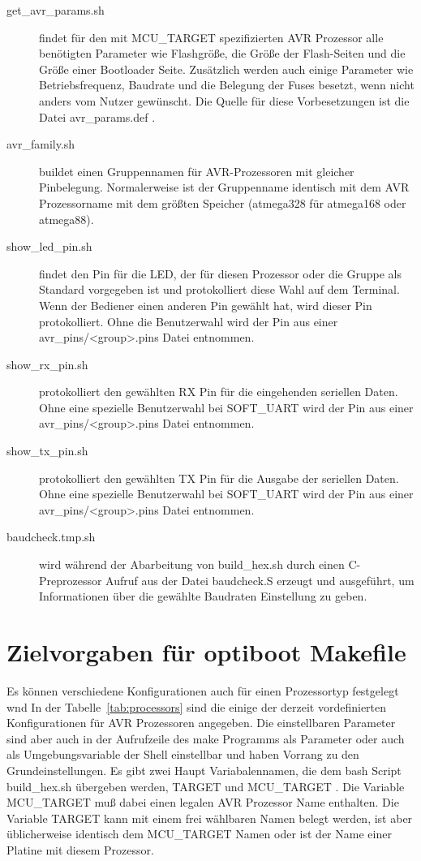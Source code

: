 \begin{description}
\item [get\_avr\_params.sh] findet für den mit MCU\_TARGET spezifizierten AVR Prozessor
alle benötigten Parameter wie Flashgröße, die Größe der Flash-Seiten und die Größe einer
Bootloader Seite. Zusätzlich werden auch einige Parameter wie Betriebsfrequenz,
Baudrate und die Belegung der Fuses besetzt, wenn nicht anders vom Nutzer gewünscht.
Die Quelle für diese Vorbesetzungen ist die Datei avr\_params.def .

\item [avr\_family.sh] buildet einen Gruppennamen für AVR-Prozessoren mit gleicher
Pinbelegung. Normalerweise ist der Gruppenname identisch mit dem AVR Prozessorname
mit dem größten Speicher (atmega328 für atmega168 oder atmega88).

\item [show\_led\_pin.sh] findet den Pin für die LED, der für diesen Prozessor
oder die Gruppe als Standard vorgegeben ist und protokolliert diese Wahl
auf dem Terminal. Wenn der Bediener einen anderen Pin gewählt hat, wird dieser
Pin protokolliert.
Ohne die Benutzerwahl wird der Pin aus einer avr\_pins/<group>.pins Datei entnommen.

\item [show\_rx\_pin.sh] protokolliert den gewählten  RX Pin für die eingehenden seriellen Daten.
Ohne eine spezielle Benutzerwahl bei SOFT\_UART wird der Pin aus einer avr\_pins/<group>.pins Datei entnommen.

\item [show\_tx\_pin.sh] protokolliert den gewählten TX Pin für die Ausgabe der seriellen Daten.
Ohne eine spezielle Benutzerwahl bei SOFT\_UART wird der Pin aus einer avr\_pins/<group>.pins Datei entnommen.

\item [baudcheck.tmp.sh] wird während der Abarbeitung von build\_hex.sh durch einen
C-Preprozessor Aufruf aus der Datei baudcheck.S erzeugt und ausgeführt, um Informationen
über die gewählte Baudraten Einstellung zu geben.

\end{description}

\section{Zielvorgaben für optiboot Makefile}

Es können verschiedene Konfigurationen auch für einen Prozessortyp
festgelegt wnd In der Tabelle~\ref{tab:processors} sind die einige der derzeit vordefinierten
Konfigurationen für AVR Prozessoren angegeben. 
Die einstellbaren Parameter sind aber auch in der Aufrufzeile des
make Programms als Parameter oder auch als Umgebungsvariable der Shell
einstellbar und haben Vorrang zu den Grundeinstellungen.
Es gibt zwei Haupt Variabalennamen, die dem bash Script build\_hex.sh übergeben
werden, TARGET und MCU\_TARGET . Die Variable MCU\_TARGET muß dabei
einen legalen AVR Prozessor Name enthalten. Die Variable TARGET kann mit einem frei wählbaren
Namen belegt werden, ist aber üblicherweise identisch dem MCU\_TARGET Namen oder
ist der Name einer Platine mit diesem Prozessor.

